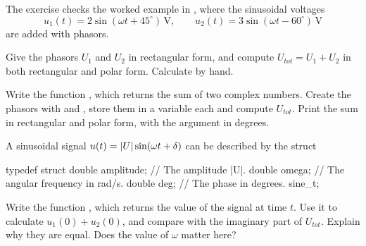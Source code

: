 The exercise checks the worked example in , where the sinusoidal
voltages
\[
  u_1(t) = 2\sin(\omega t + 45^{\circ})\,\text{V}, \qquad
  u_2(t) = 3\sin(\omega t - 60^{\circ})\,\text{V}
\]
are added with phasors.
\begin{parts}
  \item Give the phasors $U_1$ and $U_2$ in rectangular form, and compute $U_{tot} = U_1 + U_2$ in
    both rectangular and polar form. Calculate by hand.
  \item Write the function ,
    which returns the sum of two complex numbers. Create the phasors with
     and , store them in a
    variable each and compute $U_{tot}$. Print the sum in rectangular and polar form, with the
    argument in degrees.
  \item A sinusoidal signal $u(t) = \lvert U\rvert\sin(\omega t + \delta)$ can be described by the struct
\begin{ccode}
typedef struct
{
    double amplitude; // The amplitude |U|.
    double omega;     // The angular frequency in rad/s.
    double deg;       // The phase in degrees.
} sine_t;
\end{ccode}
    Write the function , which returns the
    value of the signal at time $t$. Use it to calculate $u_1(0) + u_2(0)$, and compare with the
    imaginary part of $U_{tot}$. Explain why they are equal. Does the value of $\omega$ matter here?
\end{parts}
